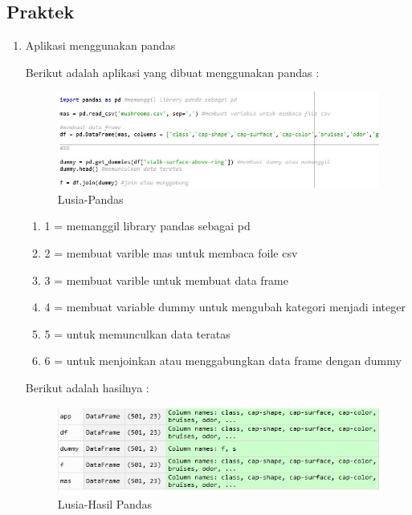 \subsection{Praktek}
\begin{enumerate}
\item Aplikasi menggunakan pandas
	\par Berikut adalah aplikasi yang dibuat menggunakan pandas :
	
		\begin{figure}[ht]
		\centering
		\includegraphics[scale=0.5]{figures/n1a.jpg}
		\caption{Lusia-Pandas}
		\label{contoh}
		\end{figure}
		
	\begin{enumerate}
	\item 1 = memanggil library pandas sebagai pd
	\item 2 = membuat varible mas untuk membaca foile csv
	\item 3 = membuat varible untuk membuat data frame
	\item 4 = membuat variable dummy untuk mengubah kategori menjadi integer
	\item 5 = untuk memunculkan data teratas
	\item 6 = untuk menjoinkan atau menggabungkan data frame dengan dummy
	\end{enumerate}
	
	\par Berikut adalah hasilnya :
	
		\begin{figure}[ht]
		\centering
		\includegraphics[scale=0.5]{figures/n1b.jpg}
		\caption{Lusia-Hasil Pandas}
		\label{contoh}
		\end{figure}	
	

\end{enumerate}
